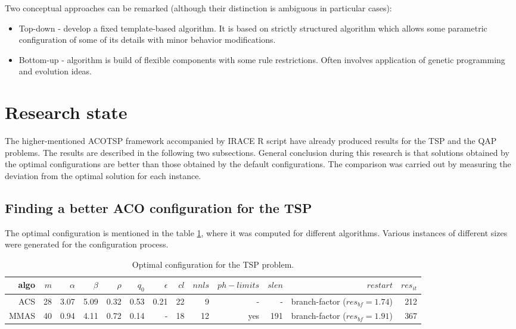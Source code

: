 \documentclass[12pt]{article}
\begin{document}
Two conceptual approaches can be remarked (although their distinction is ambiguous in particular cases):
\begin{itemize}
\item Top-down - develop a fixed template-based algorithm. It is based on strictly structured algorithm which allows some parametric configuration of some of its details with minor behavior modifications.
\item Bottom-up - algorithm is build of flexible components with some rule restrictions. Often involves application of genetic programming and evolution ideas.
\end{itemize}

\section{Research state}

The higher-mentioned ACOTSP framework accompanied by IRACE R script have already produced results for the TSP and the QAP problems. The results are described in the following two subsections. General conclusion during this research is that solutions obtained by the optimal configurations are better than those obtained by the default configurations. The comparison was carried out by measuring the deviation from the optimal solution for each instance.

\subsection{Finding a better ACO configuration for the TSP}

The optimal configuration is mentioned in the table \ref{table:table-tsp}, where it was computed for different algorithms. Various instances of different sizes were generated for the configuration process.

\begin{table}[ht]
\centering
\resizebox{\textwidth}{!}
{
\begin{tabular}{|r|r|r|r|r|r|r|r|r|r|r|r|r|}
  \hline 
    algo & $m$ & $\alpha$ & $\beta$ & $\rho$ & $q_0$ & $\epsilon$ & $cl$ & $nnls$ & $ph-limits$ & $slen$ & $restart$ & $res_{it}$\\ \hline
    ACS & 28 & 3.07 & 5.09 & 0.32 & 0.53 & 0.21 & 22 & 9 & - & - & branch-factor ($res_{bf} = 1.74$) & 212\\ \hline
	MMAS & 40 & 0.94 & 4.11 & 0.72 & 0.14 & - & 18 & 12 & yes & 191 & branch-factor ($res_{bf} = 1.91$) & 367\\ \hline
\end{tabular}
}
\caption{Optimal configuration for the TSP problem.}
\label{table:table-tsp} 
\end{table} 
\end{document}
